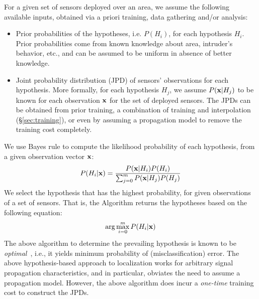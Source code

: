  For a given set of sensors deployed over an area, we
assume the following available inputs, obtained via a priori training,
data gathering and/or analysis:
\begin{itemize}
\item
Prior probabilities of the hypotheses, i.e. $P(H_i)$, for each
hypothesis $H_i$. Prior probabilities come from known knowledge about
area, intruder's behavior, etc., and can be assumed to be uniform in
absence of better knowledge.

\item
Joint probability distribution (JPD) of sensors' observations for each
hypothesis. More formally, for each hypothesis $H_j$, we assume
$P(\mathbf{x}|H_j)$ to be known for each observation $\mathbf{x}$ for the set of
deployed sensors.  The JPDs can be obtained from prior training, a
combination of training and interpolation (\S\ref{sec:training}), or
even by assuming a propagation model to remove the training
cost completely.
\end{itemize}

  We use
Bayes rule to compute the likelihood probability of each hypothesis,
from a given observation vector $\mathbf{x}$:
\begin{equation}
  P(H_i | \mathbf{x}) = \frac{P(\mathbf{x}| H_i)P(H_i)}{\sum_{j=0}^m P(\mathbf{x}|H_j)P(H_j)}
  \label{eqn:bayes}
\end{equation}
We select the hypothesis that has the highest probability, for given
observations of a set of sensors. That is, the \mll Algorithm returns
the hypotheses based on the following equation:
\begin{equation}
  \arg \max_{i=0}^m P(H_i | \mathbf{x})
  \label{eqn:map}
\end{equation}
The above \mll algorithm to determine the prevailing hypothesis is
known to be {\em optimal}~\cite{map-optimal}, i.e., it yields minimum
probability of (misclassification) error. The above hypothesis-based
approach to localization works for arbitrary signal propagation
characteristics, and in particular, obviates the need to assume a
propagation model. However, the above \mll algorithm does incur a {\em
  one-time} training cost to construct the JPDs.



